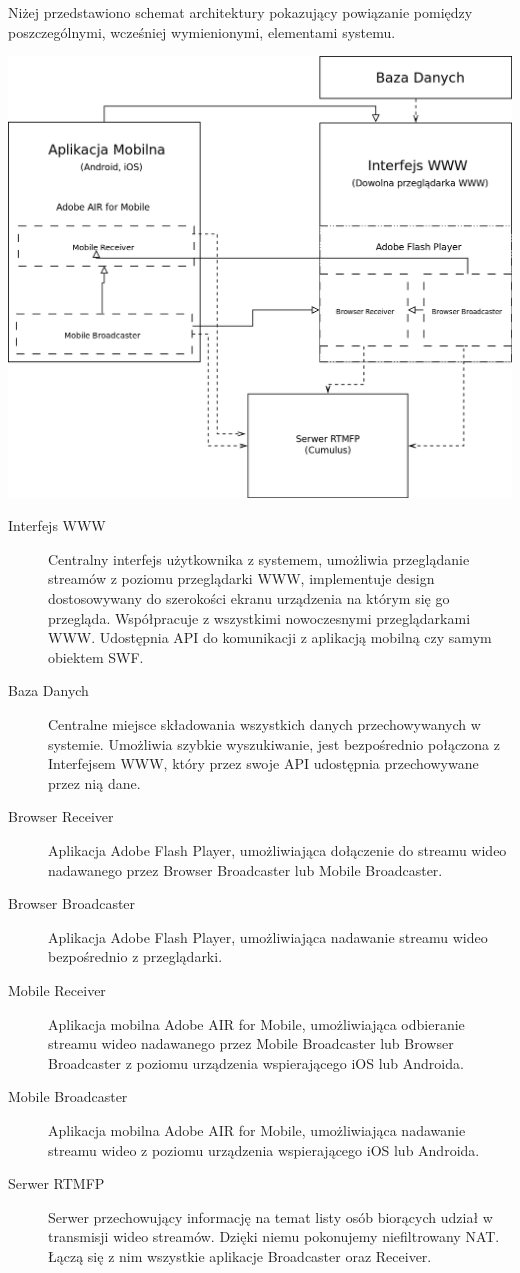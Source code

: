 \newpage
Niżej przedstawiono schemat architektury pokazujący powiązanie pomiędzy poszczególnymi, wcześniej wymienionymi, elementami systemu.
\begin{center}
    \includegraphics[width=\textwidth]{diagramy/architektura.png}
\end{center}
\begin{description}
    \item[Interfejs WWW]{Centralny interfejs użytkownika z systemem, umożliwia przeglądanie streamów z poziomu przeglądarki WWW, implementuje design dostosowywany do szerokości ekranu urządzenia na którym się go przegląda. Współpracuje z wszystkimi nowoczesnymi przeglądarkami WWW. Udostępnia API do komunikacji z aplikacją mobilną czy samym obiektem SWF.}
    \item[Baza Danych]{Centralne miejsce składowania wszystkich danych przechowywanych w systemie. Umożliwia szybkie wyszukiwanie, jest bezpośrednio połączona z Interfejsem WWW, który przez swoje API udostępnia przechowywane przez nią dane.}
    \item[Browser Receiver]{Aplikacja Adobe Flash Player, umożliwiająca dołączenie do streamu wideo nadawanego przez Browser Broadcaster lub Mobile Broadcaster.}
    \item[Browser Broadcaster]{Aplikacja Adobe Flash Player, umożliwiająca nadawanie streamu wideo bezpośrednio z przeglądarki.}
    \item[Mobile Receiver]{Aplikacja mobilna Adobe AIR for Mobile, umożliwiająca odbieranie streamu wideo nadawanego przez Mobile Broadcaster lub Browser Broadcaster z poziomu urządzenia wspierającego iOS lub Androida.}
    \item[Mobile Broadcaster]{Aplikacja mobilna Adobe AIR for Mobile, umożliwiająca nadawanie streamu wideo z poziomu urządzenia wspierającego iOS lub Androida.}
    \item[Serwer RTMFP]{Serwer przechowujący informację na temat listy osób biorących udział w transmisji wideo streamów. Dzięki niemu pokonujemy niefiltrowany NAT. Łączą się z nim wszystkie aplikacje Broadcaster oraz Receiver.}
\end{description}

